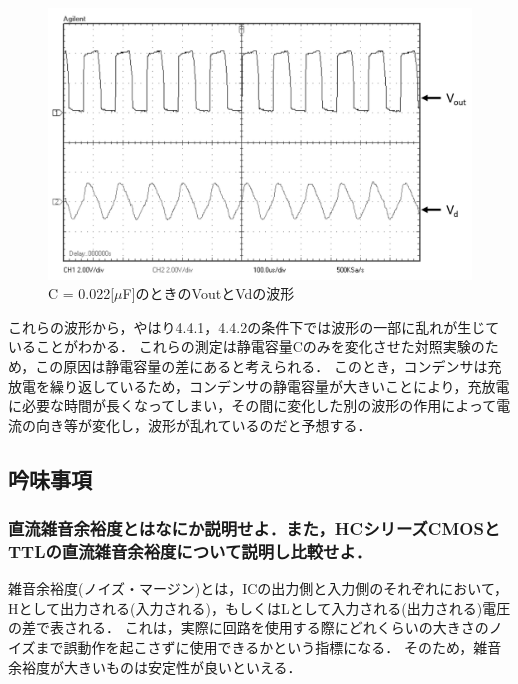 \documentclass[10pt, a4j, dvipdfmx]{jarticle}
\begin{document}
\begin{figure}[H]
    \centering
    \includegraphics[width=\hsize]{images/223kc-ex.png}
    \caption{C = 0.022[$\mu$F]のときのVoutとVdの波形}
	\label{223kc-ex}
\end{figure}
これらの波形から，やはり4.4.1，4.4.2の条件下では波形の一部に乱れが生じていることがわかる．
これらの測定は静電容量Cのみを変化させた対照実験のため，この原因は静電容量の差にあると考えられる．
このとき，コンデンサは充放電を繰り返しているため，コンデンサの静電容量が大きいことにより，充放電に必要な時間が長くなってしまい，その間に変化した別の波形の作用によって電流の向き等が変化し，波形が乱れているのだと予想する．

\newpage
\subsection*{吟味事項}
\subsubsection{直流雑音余裕度とはなにか説明せよ．また，HCシリーズCMOSとTTLの直流雑音余裕度について説明し比較せよ．}
雑音余裕度(ノイズ・マージン)とは，ICの出力側と入力側のそれぞれにおいて，Hとして出力される(入力される)，もしくはLとして入力される(出力される)電圧の差で表される．
これは，実際に回路を使用する際にどれくらいの大きさのノイズまで誤動作を起こさずに使用できるかという指標になる．
そのため，雑音余裕度が大きいものは安定性が良いといえる．
\end{document}
